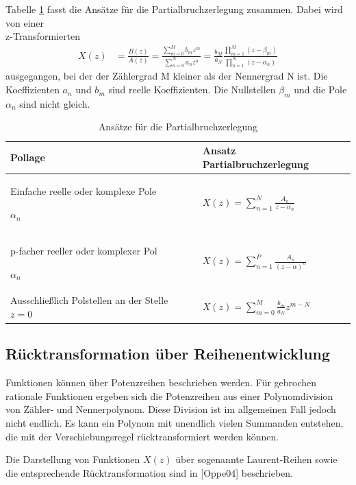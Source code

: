 Tabelle \ref{tab:5.6} fasst die Ansätze für die Partialbruchzerlegung zusammen. Dabei wird von einer\\
z-Transformierten
\begin{align}
X(z) &= \frac{B(z)}{A(z)} = \frac{\sum\limits_{m = 0}^{M}{b_{m}  z^{m}}}{\sum\limits_{n = 0}^{N}{a_{n}  z^{n}}} = \frac{b_{M}}{a_{N}}  \frac{\prod\limits_{m = 1}^{M}\left( z - \beta_{m} \right)}{\prod\limits_{n = 1}^{N}\left( z - \alpha_{n} \right)} \label{eq:5.120}
\end{align}
ausgegangen, bei der der Zählergrad M kleiner als der Nennergrad N ist. Die Koeffizienten \(a_{n}\) und \(b_{m}\) sind reelle Koeffizienten. Die Nullstellen \(β_{m}\) und die Pole \(α_{n}\) sind nicht gleich.

\begin{table}
  \centering
  \caption{Ansätze für die Partialbruchzerlegung}
  \label{tab:5.6}
  \begin{tabular}{ll}
    \toprule
    Pollage & Ansatz Partialbruchzerlegung \\
    \midrule
    Einfache reelle oder komplexe Pole

\(\alpha_{n}\) & \(X(z) = \sum\limits_{n = 1}^{N}\frac{A_{n}}{z - \alpha_{n}}\) \\
    p-facher reeller oder komplexer Pol

\(\alpha_{n}\) & \(X(z) = \sum\limits_{n = 1}^{P}\frac{A_{n}}{(z - \alpha)^{n}}\) \\
    Ausschließlich Polstellen an der Stelle \(z = 0\) & \(X(z) = \sum\limits_{m = 0}^{M}{\frac{b_{m}}{a_{N}}  z^{m - N}}\) \\
    \bottomrule
  \end{tabular}
\end{table}

\subsection{Rücktransformation über Reihenentwicklung}\label{sec:ruxfccktransformation-uxfcber-reihenentwicklung}

Funktionen können über Potenzreihen beschrieben werden. Für gebrochen rationale Funktionen ergeben sich die Potenzreihen aus einer Polynomdivision von Zähler- und Nennerpolynom. Diese Division ist im allgemeinen Fall jedoch nicht endlich. Es kann ein Polynom mit unendlich vielen Summanden entstehen, die mit der Verschiebungsregel rücktransformiert werden können.

Die Darstellung von Funktionen \(X(z)\) über sogenannte Laurent-Reihen sowie die entsprechende Rücktransformation sind in {[}Oppe04{]} beschrieben.

